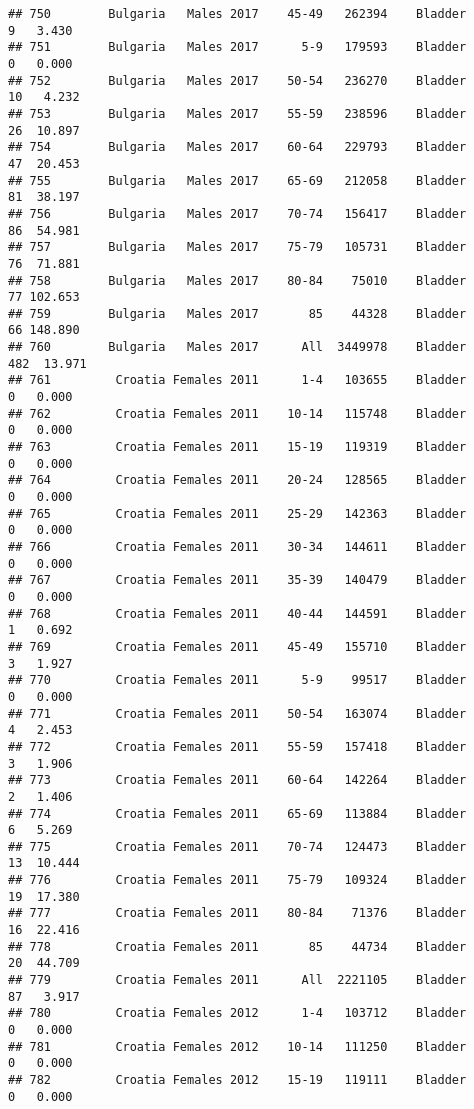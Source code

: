 \documentclass[
]{article}
\begin{document}
\begin{verbatim}
## 750        Bulgaria   Males 2017    45-49   262394    Bladder      9   3.430
## 751        Bulgaria   Males 2017      5-9   179593    Bladder      0   0.000
## 752        Bulgaria   Males 2017    50-54   236270    Bladder     10   4.232
## 753        Bulgaria   Males 2017    55-59   238596    Bladder     26  10.897
## 754        Bulgaria   Males 2017    60-64   229793    Bladder     47  20.453
## 755        Bulgaria   Males 2017    65-69   212058    Bladder     81  38.197
## 756        Bulgaria   Males 2017    70-74   156417    Bladder     86  54.981
## 757        Bulgaria   Males 2017    75-79   105731    Bladder     76  71.881
## 758        Bulgaria   Males 2017    80-84    75010    Bladder     77 102.653
## 759        Bulgaria   Males 2017       85    44328    Bladder     66 148.890
## 760        Bulgaria   Males 2017      All  3449978    Bladder    482  13.971
## 761         Croatia Females 2011      1-4   103655    Bladder      0   0.000
## 762         Croatia Females 2011    10-14   115748    Bladder      0   0.000
## 763         Croatia Females 2011    15-19   119319    Bladder      0   0.000
## 764         Croatia Females 2011    20-24   128565    Bladder      0   0.000
## 765         Croatia Females 2011    25-29   142363    Bladder      0   0.000
## 766         Croatia Females 2011    30-34   144611    Bladder      0   0.000
## 767         Croatia Females 2011    35-39   140479    Bladder      0   0.000
## 768         Croatia Females 2011    40-44   144591    Bladder      1   0.692
## 769         Croatia Females 2011    45-49   155710    Bladder      3   1.927
## 770         Croatia Females 2011      5-9    99517    Bladder      0   0.000
## 771         Croatia Females 2011    50-54   163074    Bladder      4   2.453
## 772         Croatia Females 2011    55-59   157418    Bladder      3   1.906
## 773         Croatia Females 2011    60-64   142264    Bladder      2   1.406
## 774         Croatia Females 2011    65-69   113884    Bladder      6   5.269
## 775         Croatia Females 2011    70-74   124473    Bladder     13  10.444
## 776         Croatia Females 2011    75-79   109324    Bladder     19  17.380
## 777         Croatia Females 2011    80-84    71376    Bladder     16  22.416
## 778         Croatia Females 2011       85    44734    Bladder     20  44.709
## 779         Croatia Females 2011      All  2221105    Bladder     87   3.917
## 780         Croatia Females 2012      1-4   103712    Bladder      0   0.000
## 781         Croatia Females 2012    10-14   111250    Bladder      0   0.000
## 782         Croatia Females 2012    15-19   119111    Bladder      0   0.000

\end{verbatim}
\end{document}
